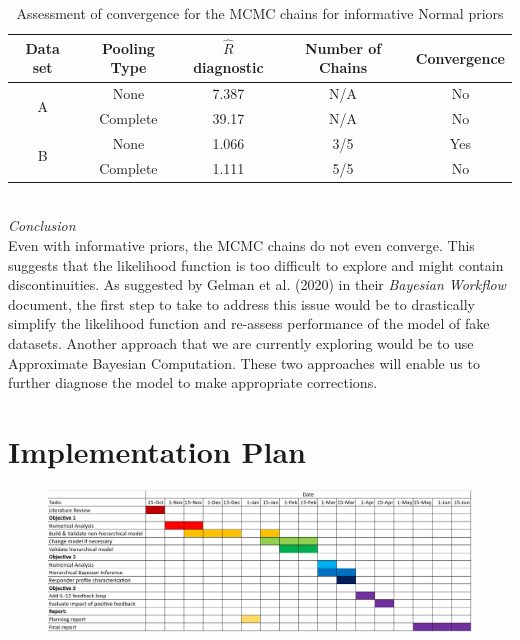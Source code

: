 \documentclass[11pt]{article}
\begin{document}
\begin{table}[!h]
    \centering
    \caption{Assessment of convergence for the MCMC chains for informative Normal priors}
    \begin{tabular}{c|c||c|c|c}
        \hline
        Data set & Pooling Type & $\hat{R}$ diagnostic & Number of Chains & Convergence  \\ \hline 
        \multirow{2}{*}{A}      & None     & 7.387 & N/A & No \\
                                & Complete & 39.17 & N/A & No \\ \hline 
        \multirow{2}{*}{B}      & None     & 1.066 & 3/5 & Yes \\
                                & Complete & 1.111 & 5/5 & No \\ \hline 
    \end{tabular}
    \label{tbl:rhat_4}
\end{table}
~\\
\textit{Conclusion}\\[5pt]
Even with informative priors, the MCMC chains do not even converge. This suggests that the likelihood function is too difficult to explore and might contain discontinuities. As suggested by Gelman et al. (2020) in their \textit{Bayesian Workflow} document, the first step to take to address this issue would be to drastically simplify the likelihood function and re-assess performance of the model of fake datasets. Another approach that we are currently exploring would be to use Approximate Bayesian Computation. These two approaches will enable us to further diagnose the model to make appropriate corrections.


\section{Implementation Plan}\label{sec:plan}

\begin{figure}[!ht]
    \centering\includegraphics[scale=0.32]{testo.png}
\end{figure}
\end{document}
